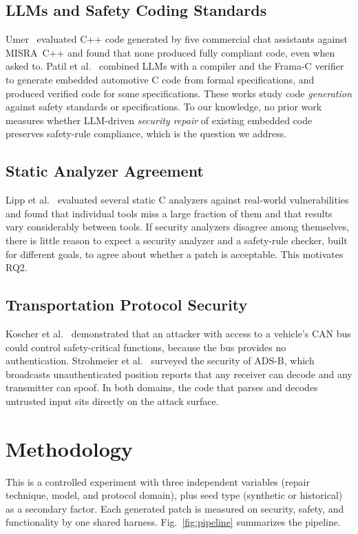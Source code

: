 \documentclass[12pt]{IEEEtran}
\begin{document}
\subsection{LLMs and Safety Coding Standards}
Umer~\cite{umer2025misra} evaluated C++ code generated by five commercial chat assistants against MISRA~C++ and found that none produced fully compliant code, even when asked to. Patil et al.~\cite{patil2024spec2code} combined LLMs with a compiler and the Frama-C verifier to generate embedded automotive C code from formal specifications, and produced verified code for some specifications. These works study code \emph{generation} against safety standards or specifications. To our knowledge, no prior work measures whether LLM-driven \emph{security repair} of existing embedded code preserves safety-rule compliance, which is the question we address.

\subsection{Static Analyzer Agreement}
Lipp et al.~\cite{lipp2022static} evaluated several static C analyzers against real-world vulnerabilities and found that individual tools miss a large fraction of them and that results vary considerably between tools. If security analyzers disagree among themselves, there is little reason to expect a security analyzer and a safety-rule checker, built for different goals, to agree about whether a patch is acceptable. This motivates RQ2.

\subsection{Transportation Protocol Security}
Koscher et al.~\cite{koscher2010experimental} demonstrated that an attacker with access to a vehicle's CAN bus could control safety-critical functions, because the bus provides no authentication. Strohmeier et al.~\cite{strohmeier2015adsb} surveyed the security of ADS-B, which broadcasts unauthenticated position reports that any receiver can decode and any transmitter can spoof. In both domains, the code that parses and decodes untrusted input sits directly on the attack surface.

\section{Methodology}
\label{sec:method}
This is a controlled experiment with three independent variables (repair technique, model, and protocol domain), plus seed type (synthetic or historical) as a secondary factor. Each generated patch is measured on security, safety, and functionality by one shared harness. Fig.~\ref{fig:pipeline} summarizes the pipeline.
\end{document}
